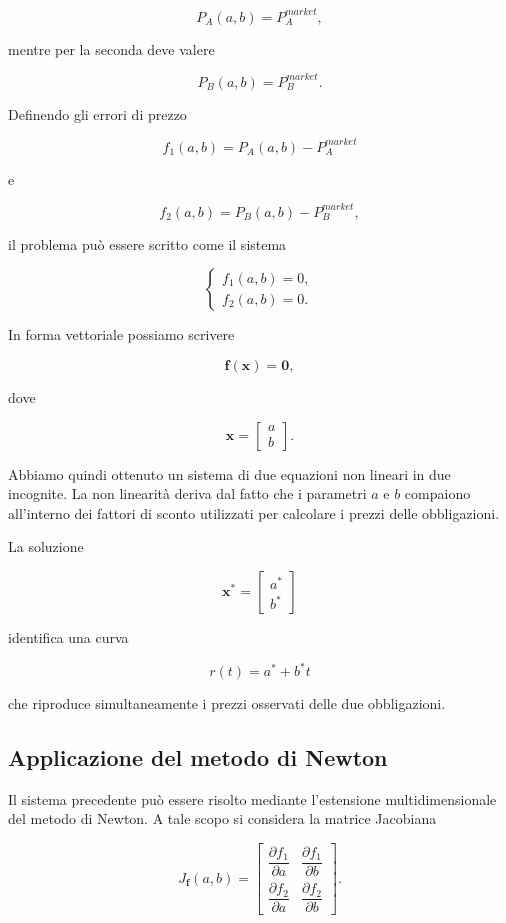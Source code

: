 \[
P_A(a,b)=P_A^{market},
\]

mentre per la seconda deve valere

\[
P_B(a,b)=P_B^{market}.
\]

Definendo gli errori di prezzo

\[
f_1(a,b)
=
P_A(a,b)-P_A^{market}
\]

e

\[
f_2(a,b)
=
P_B(a,b)-P_B^{market},
\]

il problema può essere scritto come il sistema

\[
\begin{cases}
f_1(a,b)=0,\\
f_2(a,b)=0.
\end{cases}
\]

In forma vettoriale possiamo scrivere

\[
\mathbf{f}(\mathbf{x})=\mathbf{0},
\]

dove

\[
\mathbf{x}
=
\begin{bmatrix}
a\\
b
\end{bmatrix}.
\]

Abbiamo quindi ottenuto un sistema di due equazioni non lineari in due incognite. La non linearità deriva dal fatto che i parametri $a$ e $b$ compaiono all'interno dei fattori di sconto utilizzati per calcolare i prezzi delle obbligazioni.

La soluzione

\[
\mathbf{x}^*
=
\begin{bmatrix}
a^*\\
b^*
\end{bmatrix}
\]

identifica una curva

\[
r(t)=a^*+b^*t
\]

che riproduce simultaneamente i prezzi osservati delle due obbligazioni.

\subsection{Applicazione del metodo di Newton}

Il sistema precedente può essere risolto mediante l'estensione multidimensionale del metodo di Newton. A tale scopo si considera la matrice Jacobiana

\[
J_{\mathbf f}(a,b)
=
\begin{bmatrix}
\dfrac{\partial f_1}{\partial a}
&
\dfrac{\partial f_1}{\partial b}
\\[8pt]
\dfrac{\partial f_2}{\partial a}
&
\dfrac{\partial f_2}{\partial b}
\end{bmatrix}.
\]

